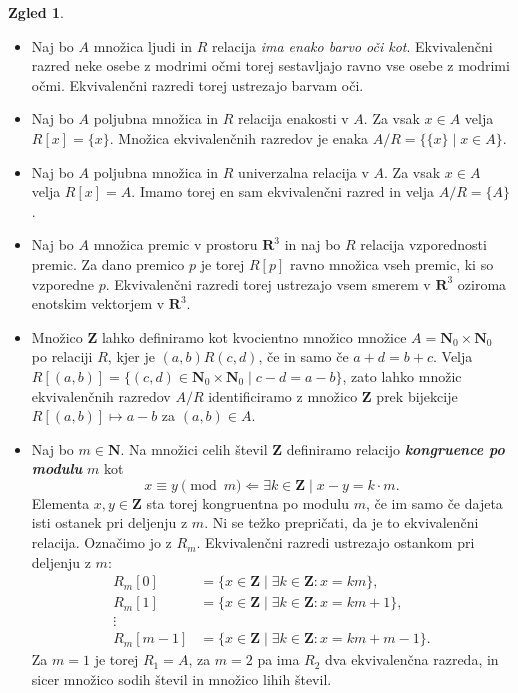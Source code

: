 \documentclass[11pt]{book}
\def\NN{\mathbf{N}}
\def\ZZ{\mathbf{Z}}
\def\RR{\mathbf{R}}
\def\definicija{\color{rdeca}\bf\em}
\theoremstyle{definition}
\theoremstyle{zgled}
\newtheorem*{zgled}{Zgled}
\theoremstyle{odprtproblem}
\theoremstyle{domacanaloga}
\theoremstyle{izrek}
\begin{document}
\begin{zgled} \leavevmode
\begin{itemize}
    \item Naj bo $A$ množica ljudi in $R$ relacija \emph{ima enako barvo oči kot}. Ekvivalenčni razred neke osebe z modrimi očmi torej sestavljajo ravno vse osebe z modrimi očmi. Ekvivalenčni razredi torej ustrezajo barvam oči.
    \item Naj bo $A$ poljubna množica in $R$ relacija enakosti v $A$. Za vsak $x \in A$ velja $R[x] = \{ x \}$. Množica ekvivalenčnih razredov je enaka $A/R = \{ \{ x \} \mid x \in A \}$.
    \item Naj bo $A$ poljubna množica in $R$ univerzalna relacija v $A$. Za vsak $x \in A$ velja $R[x] = A$. Imamo torej en sam ekvivalenčni razred in velja $A/R = \{ A \}$.
    \item Naj bo $A$ množica premic v prostoru $\RR^3$ in naj bo $R$ relacija vzporednosti premic. Za dano premico $p$ je torej $R[p]$ ravno množica vseh premic, ki so vzporedne $p$. Ekvivalenčni razredi torej ustrezajo vsem smerem v $\RR^3$ oziroma enotskim vektorjem v $\RR^3$.
    \item Množico $\ZZ$ lahko definiramo kot kvocientno množico množice $A = \NN_0 \times \NN_0$ po relaciji $R$, kjer je $(a,b)R(c,d)$, če in samo če $a+d = b+c$. Velja $R[(a,b)] = \{ (c,d) \in \NN_0 \times \NN_0 \mid c-d = a-b \}$, zato lahko množic ekvivalenčnih razredov $A/R$ identificiramo z množico $\ZZ$ prek bijekcije $R[(a,b)] \mapsto a-b$ za $(a,b) \in A$.
    \item Naj bo $m \in \NN$. Na množici celih števil $\ZZ$ definiramo relacijo {\definicija kongruence po modulu} $m$ kot
    \[
        x \equiv y \pmod{m} \Longleftarrow \exists k \in \ZZ \mid x - y = k \cdot m.
    \]
    Elementa $x,y \in \ZZ$ sta torej kongruentna po modulu $m$, če im samo če dajeta isti ostanek pri deljenju z $m$. Ni se težko prepričati, da je to ekvivalenčni relacija. Označimo jo z $R_m$. Ekvivalenčni razredi ustrezajo ostankom pri deljenju z $m$:
    \begin{align*}
        R_m[0] &= \{ x \in \ZZ \mid \exists k \in \ZZ \colon x = k m \}, \\
        R_m[1] &= \{ x \in \ZZ \mid \exists k \in \ZZ \colon x = k m + 1 \}, \\
        \vdots \\
        R_m[m-1] &= \{ x \in \ZZ \mid \exists k \in \ZZ \colon x = k m +m-1 \}.
    \end{align*}
    Za $m = 1$ je torej $R_1 = A$, za $m = 2$ pa ima $R_2$ dva ekvivalenčna razreda, in sicer množico sodih števil in množico lihih števil.
\end{itemize}
\end{zgled}
\end{document}

